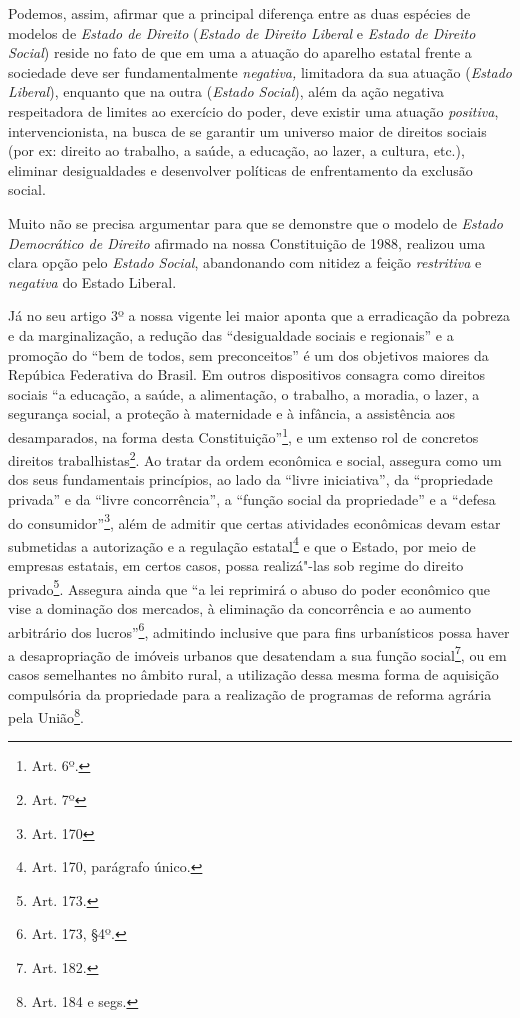 Podemos, assim, afirmar que a principal diferença entre as duas espécies
de modelos de \emph{Estado de Direito} (\emph{Estado de Direito Liberal}
e \emph{Estado de Direito Social}) reside no fato de que em uma a
atuação do aparelho estatal frente a sociedade deve ser fundamentalmente
\emph{negativa,} limitadora da sua atuação (\emph{Estado Liberal}),
enquanto que na outra (\emph{Estado Social}), além da ação negativa
respeitadora de limites ao exercício do poder, deve existir uma atuação
\emph{positiva}, intervencionista, na busca de se garantir um universo
maior de direitos sociais (por ex: direito ao trabalho, a saúde, a
educação, ao lazer, a cultura, etc.), eliminar desigualdades e
desenvolver políticas de enfrentamento da exclusão social.

Muito não se precisa argumentar para que se demonstre que o modelo de
\emph{Estado Democrático de Direito} afirmado na nossa Constituição de
1988, realizou uma clara opção pelo \emph{Estado Social}, abandonando
com nitidez a feição \emph{restritiva} e \emph{negativa} do Estado
Liberal.

Já no seu artigo 3º a nossa vigente lei maior aponta que a erradicação
da pobreza e da marginalização, a redução das ``desigualdade
sociais e regionais'' e a promoção do ``bem de todos, sem
preconceitos'' é um dos objetivos maiores da Repúbica Federativa do
Brasil. Em outros dispositivos consagra como direitos sociais ``a
educação, a saúde, a alimentação, o trabalho, a moradia, o lazer, a
segurança social, a proteção à maternidade e à infância, a assistência
aos desamparados, na forma desta Constituição''\footnote{Art. 6º.}, e
um extenso rol de concretos direitos trabalhistas\footnote{Art. 7º}. Ao
tratar da ordem econômica e social, assegura como um dos seus
fundamentais princípios, ao lado da ``livre iniciativa'', da
``propriedade privada'' e da ``livre concorrência'', a
``função social da propriedade'' e a ``defesa do
consumidor''\footnote{Art. 170}, além de admitir que certas atividades
econômicas devam estar submetidas a autorização e a regulação
estatal\footnote{Art. 170, parágrafo único.} e que o Estado, por meio de
empresas estatais, em certos casos, possa realizá"-las sob regime do
direito privado\footnote{Art. 173.}. Assegura ainda que ``a lei
reprimirá o abuso do poder econômico que vise a dominação dos mercados,
à eliminação da concorrência e ao aumento arbitrário dos
lucros''\footnote{Art. 173, §4º.}, admitindo inclusive que para
fins urbanísticos possa haver a desapropriação de imóveis urbanos que
desatendam a sua função social\footnote{Art. 182.}, ou em casos
semelhantes no âmbito rural, a utilização dessa mesma forma de aquisição
compulsória da propriedade para a realização de programas de reforma
agrária pela União\footnote{Art. 184 e segs.}.

